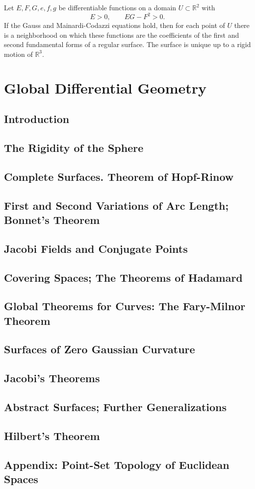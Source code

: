 \documentclass[12pt, oneside]{book}
\begin{document}
\begin{theorem}
    Let $E,F,G,e,f,g$ be differentiable functions on a domain
    $U\subset\mathbb{R}^2$ with
    \[
        E>0,\qquad EG-F^2>0.
    \]
    If the Gauss and Mainardi-Codazzi equations hold, then for each point of
    $U$ there is a neighborhood on which these functions are the coefficients
    of the first and second fundamental forms of a regular surface.  The surface
    is unique up to a rigid motion of $\mathbb{R}^3$.
\end{theorem}

\chapter{Global Differential Geometry}

\section{Introduction}
\section{The Rigidity of the Sphere}
\section{Complete Surfaces. Theorem of Hopf-Rinow}
\section{First and Second Variations of Arc Length; Bonnet's Theorem}
\section{Jacobi Fields and Conjugate Points}
\section{Covering Spaces; The Theorems of Hadamard}
\section{Global Theorems for Curves: The Fary-Milnor Theorem}
\section{Surfaces of Zero Gaussian Curvature}
\section{Jacobi's Theorems}
\section{Abstract Surfaces; Further Generalizations}
\section{Hilbert's Theorem}
\section*{Appendix: Point-Set Topology of Euclidean Spaces}

\backmatter
\end{document}
